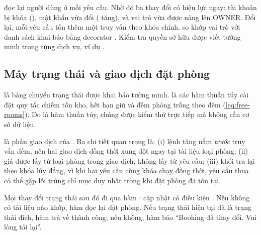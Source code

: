  đọc lại người dùng ở mỗi yêu cầu. Nhờ đó ba thay đổi có hiệu lực ngay: tài khoản bị khóa (), mật khẩu vừa đổi ( tăng), và vai trò vừa được nâng lên OWNER. Đổi lại, mỗi yêu cầu tốn thêm một truy vấn theo khóa chính.  so khớp vai trò với danh sách khai báo bằng decorator . Kiểm tra quyền sở hữu được viết tường minh trong từng dịch vụ, ví dụ .

\subsection{Máy trạng thái và giao dịch đặt phòng}\label{sec:impl-booking}

 là bảng chuyển trạng thái được khai báo tường minh.  là các hàm thuần túy cài đặt quy tắc chiếm tồn kho, hết hạn giữ và đếm phòng trống theo đêm (\cref{eq:free-rooms}). Do là hàm thuần túy, chúng được kiểm thử trực tiếp mà không cần cơ sở dữ liệu.





 là phần giao dịch của . Ba chi tiết quan trọng là: (i) lệnh  tăng  nằm \emph{trước} truy vấn đếm, nên hai giao dịch đồng thời xung đột ngay tại tài liệu loại phòng; (ii) giá được lấy từ loại phòng trong giao dịch, không lấy từ yêu cầu; (iii) khối  tra lại theo khóa lũy đẳng, vì khi hai yêu cầu cùng khóa chạy đồng thời, yêu cầu thua có thể gặp lỗi trùng chỉ mục duy nhất trong khi đặt phòng đã tồn tại.



Mọi thay đổi trạng thái sau đó đi qua hàm : cập nhật có điều kiện . Nếu không có tài liệu nào khớp, hàm đọc lại đặt phòng. Nếu trạng thái hiện tại đã là trạng thái đích, hàm trả về thành công; nếu không, hàm báo ``Booking đã thay đổi. Vui lòng tải lại''.

